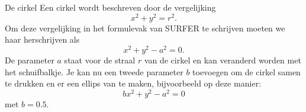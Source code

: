 \begin{surferPage}[Cirkel]{De cirkel}
Een cirkel wordt beschreven door de vergelijking
\[x^2+y^2=r^2.\]
Om deze vergelijking in het formulevak van SURFER te schrijven moeten we haar herschrijven als
\[x^2+y^2-a^2=0.\]
De parameter $a$ staat voor de straal $r$ van de cirkel en kan veranderd worden met het schuifbalkje. Je kan nu een tweede parameter $b$ toevoegen om de cirkel samen te drukken en er een ellips van te maken, bijvoorbeeld op deze manier:
\[bx^2+y^2-a^2=0\] met $b = 0.5$.
\end{surferPage}
